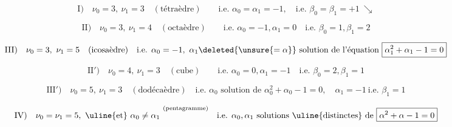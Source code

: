
\[
 \mathrm{I})\quad\nu_0=3,\ \nu_1=3\quad(\text{tétraèdre})\qquad
 \text{i.e. }\alpha_0=\alpha_1=-1,\quad\text{i.e. }\beta_0=\beta_1=+1\ \searrow
\]

\[
 \mathrm{II})\quad\nu_0=3,\ \nu_1=4\quad(\text{octaèdre})\qquad
 \text{i.e. }\alpha_0=-1,\alpha_1=0\quad\text{i.e. }\beta_0=1,\beta_1=2
\]

\[
 \mathrm{III})\quad\nu_0=3,\ \nu_1=5\quad(\text{icosaèdre})\quad
 \text{i.e. }\alpha_0=-1,\ \alpha_1\deleted{\unsure{=\alpha}}\text{ solution de l'équation }
 \boxed{\alpha_1^2+\alpha_1-1=0}
\]

\[
 \mathrm{II}')\quad\nu_0=4,\ \nu_1=3\quad(\text{cube})\qquad
 \text{i.e. }\alpha_0=0,\alpha_1=-1\quad\text{i.e. }\beta_0=2,\beta_1=1
\]

\[
 \mathrm{III}')\quad\nu_0=5,\ \nu_1=3\quad(\text{dodécaèdre})\quad
 \text{i.e. }\alpha_0\text{ solution de }\boxed{\alpha_0^2+\alpha_0-1=0},\quad
 \alpha_1=-1\ \text{i.e. }\beta_1=1
\]

\[
 \mathrm{IV})\quad\nu_0=\nu_1=5,\ \uline{\text{et}}\ \alpha_0\ne\alpha_1\
 \overset{\text{(pentagramme)}}{\vphantom{I}}\quad\text{i.e. }\alpha_0,\alpha_1
 \text{ solutions }\uline{\text{distinctes}}\text{ de }\boxed{\alpha^2+\alpha-1=0}
\]
